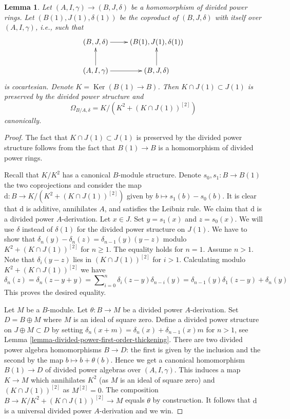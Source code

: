 \documentclass{stacks-project}
\theoremstyle{plain}
\newtheorem{lemma}[subsection]{Lemma}
\theoremstyle{definition}
\theoremstyle{remark}
\numberwithin{equation}{subsection}
\def\Ker{\mathop{\mathrm{Ker}}}
\begin{document}
\begin{lemma}
\label{lemma-diagonal-and-differentials}
Let $(A, I, \gamma) \to (B, J, \delta)$ be a homomorphism
of divided power rings. Let $(B(1), J(1), \delta(1))$ be the coproduct
of $(B, J, \delta)$ with itself over $(A, I, \gamma)$, i.e.,
such that
$$
\xymatrix{
(B, J, \delta) \ar[r] & (B(1), J(1), \delta(1)) \\
(A, I, \gamma) \ar[r] \ar[u] & (B, J, \delta) \ar[u]
}
$$
is cocartesian. Denote $K = \Ker(B(1) \to B)$.
Then $K \cap J(1) \subset J(1)$ is preserved by the divided power
structure and
$$
\Omega_{B/A, \delta} = K/ \left(K^2 + (K \cap J(1))^{[2]}\right)
$$
canonically.
\end{lemma}

\begin{proof}
The fact that $K \cap J(1) \subset J(1)$ is preserved by the divided power
structure follows from the fact that $B(1) \to B$ is a homomorphism of
divided power rings.

\medskip\noindent
Recall that $K/K^2$ has a canonical $B$-module structure.
Denote $s_0, s_1 : B \to B(1)$ the two coprojections and consider
the map $\text{d} : B \to K/(K^2 +(K \cap J(1))^{[2]})$ given by
$b \mapsto s_1(b) - s_0(b)$. It is clear that $\text{d}$ is additive,
annihilates $A$, and satisfies the Leibniz rule.
We claim that $\text{d}$ is a divided power $A$-derivation.
Let $x \in J$. Set $y = s_1(x)$ and $z = s_0(x)$.
We will use $\delta$ instead of $\delta(1)$ for
the divided power structure on $J(1)$.
We have to show that $\delta_n(y) - \delta_n(z) = \delta_{n - 1}(y)(y - z)$
modulo $K^2 +(K \cap J(1))^{[2]}$ for $n \geq 1$.
The equality holds for $n = 1$. Assume $n > 1$.
Note that $\delta_i(y - z)$ lies in $(K \cap J(1))^{[2]}$ for $i > 1$.
Calculating modulo $K^2 + (K \cap J(1))^{[2]}$ we have
$$
\delta_n(z) = \delta_n(z - y + y) =
\sum\nolimits_{i = 0}^n \delta_i(z - y)\delta_{n - i}(y) =
\delta_{n - 1}(y) \delta_1(z - y) + \delta_n(y)
$$
This proves the desired equality.

\medskip\noindent
Let $M$ be a $B$-module. Let $\theta : B \to M$ be a divided power
$A$-derivation.
Set $D = B \oplus M$ where $M$ is an ideal of square zero. Define a
divided power structure on $J \oplus M \subset D$ by setting
$\delta_n(x + m) = \delta_n(x) + \delta_{n - 1}(x)m$ for $n > 1$, see
Lemma \ref{lemma-divided-power-first-order-thickening}.
There are two divided power algebra homomorphisms $B \to D$: the first
is given by the inclusion and the second by the map $b \mapsto b + \theta(b)$.
Hence we get a canonical homomorphism $B(1) \to D$ of divided power
algebras over $(A, I, \gamma)$. This induces a map $K \to M$
which annihilates $K^2$ (as $M$ is an ideal of square zero) and
$(K \cap J(1))^{[2]}$ as $M^{[2]} = 0$. The composition
$B \to K/K^2 + (K \cap J(1))^{[2]} \to M$ equals $\theta$ by construction.
It follows that $\text{d}$
is a universal divided power $A$-derivation and we win.
\end{proof}
\end{document}
